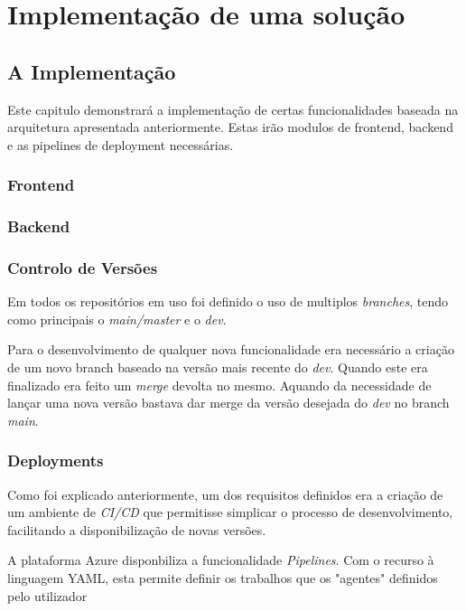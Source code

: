 \chapter{Implementação de uma solução}

\section{A Implementação}

Este capitulo demonstrará a implementação de certas funcionalidades baseada na arquitetura apresentada anteriormente. Estas irão modulos de frontend, backend e as pipelines de deployment necessárias. 

\subsection{Frontend}

\subsection{Backend}

\subsection{Controlo de Versões}

Em todos os repositórios em uso foi definido o uso de multiplos \textit{branches}, tendo como principais o \textit{main/master} e o \textit{dev}. 

Para o desenvolvimento de qualquer nova funcionalidade era necessário a criação de um novo branch baseado na versão mais recente do \textit{dev}. Quando este era finalizado era feito um \textit{merge} devolta no mesmo. Aquando da necessidade de lançar uma nova versão bastava dar merge da versão desejada do \textit{dev} no branch \textit{main}.

\subsection{Deployments}

Como foi explicado anteriormente, um dos requisitos definidos  era a criação de um ambiente de \textit{CI/CD} que permitisse simplicar o processo de desenvolvimento, facilitando a disponibilização de novas versões.

A plataforma Azure disponbiliza a funcionalidade \textit{Pipelines}. Com o recurso à linguagem YAML, esta permite definir os trabalhos que os "agentes" definidos pelo utilizador

